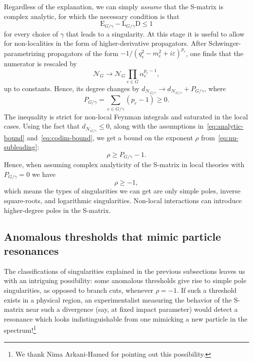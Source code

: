 \documentclass[12pt]{article}
\numberwithin{figure}{section}
\def \be {\begin{equation}}
\def \ee {\end{equation}}
\def \D {\mathrm{D}}
\def \E {\mathrm{E}}
\def \L {\mathrm{L}}
\def \eps {\varepsilon}
\def \leq {\leqslant}
\def \geq {\geqslant}
\def \N {\mathcal{N}}
\def \upgamma {\rho}
\begin{document}
				
				Regardless of the explanation, we can simply \emph{assume} that the S-matrix is complex analytic, for which the necessary condition is that
				\be
				\label{eq:analytic-bound}
				\E_{G/\gamma} - \L_{G/\gamma} \D \leq 1
				\ee
				for every choice of $\gamma$ that leads to a singularity.
				At this stage it is useful to allow for non-localities in the form of higher-derivative propagators. After Schwinger-parametrizing propagators of the form $-1/(q_e^2 - m_e^2 + i\eps)^{p_e}$, one finds that the numerator is rescaled by
				\be\label{eq:codim-bound}
				\N_G \to \N_G \prod_{e \in G} \alpha_e^{p_e - 1},
				\ee
				up to constants. Hence, its degree changes by $d_{\N_{G/\gamma}} \to d_{\N_{G/\gamma}} + P_{G/\gamma}$, where
				\be
				P_{G/\gamma} = \sum_{e\in G/\gamma} (p_e - 1) \geq 0.
				\ee
				The inequality is strict for non-local Feynman integrals and saturated in the local cases. Using the fact that $d_{\N_{G/\gamma}} \leq 0$, along with the assumptions in~\eqref{eq:analytic-bound} and~\eqref{eq:codim-bound}, we get a bound on the exponent $\upgamma$ from~\eqref{eq:nu-subleading}:
				\be
				\upgamma \geq P_{G/\gamma} - 1.
				\ee
				Hence, when assuming complex analyticity of the S-matrix in local theories with $P_{G/\gamma} = 0$ we have
				\be
				\boxed{\upgamma \geq -1,}
				\ee
				which means the types of singularities we can get are only simple poles, inverse square-roots, and logarithmic singularities. Non-local interactions can introduce higher-degree poles in the S-matrix.
				
				\subsection{Anomalous thresholds that mimic particle resonances}
				
				The classifications of singularities explained in the previous subsections leaves us with an intriguing possibility: some anomalous thresholds give rise to simple pole singularities, as opposed to branch cuts, whenever $\upgamma = -1$.
				If such a threshold exists in a physical region, an experimentalist measuring the behavior of the S-matrix near such a divergence (say, at fixed impact parameter) would detect a resonance which looks indistinguishable from one mimicking a new particle in the spectrum!\footnote{We thank Nima Arkani-Hamed for pointing out this possibility.}
				
\end{document}
